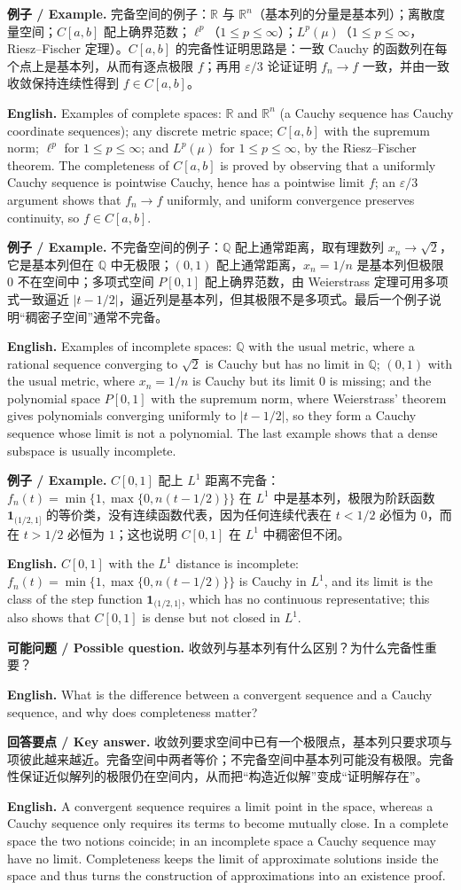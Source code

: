 \documentclass[UTF8,11pt,a4paper]{ctexart}
\newcommand{\EN}[1]{\par\noindent \textbf{English.} #1\par}
\newcommand{\EX}[2]{\par\noindent \textbf{例子 / Example.} #1\par\EN{#2}}
\newcommand{\ASK}[4]{\par\noindent \textbf{可能问题 / Possible question.} #1\par\EN{#2}\noindent \textbf{回答要点 / Key answer.} #3\par\EN{#4}\smallskip}
\begin{document}
\EX{完备空间的例子：$\mathbb R$ 与 $\mathbb R^n$（基本列的分量是基本列）；离散度量空间；$C[a,b]$ 配上确界范数；$\ell^p$（$1\le p\le\infty$）；$L^p(\mu)$（$1\le p\le\infty$，Riesz--Fischer 定理）。$C[a,b]$ 的完备性证明思路是：一致 Cauchy 的函数列在每个点上是基本列，从而有逐点极限 $f$；再用 $\varepsilon/3$ 论证证明 $f_n\to f$ 一致，并由一致收敛保持连续性得到 $f\in C[a,b]$。}{Examples of complete spaces: $\mathbb R$ and $\mathbb R^n$ (a Cauchy sequence has Cauchy coordinate sequences); any discrete metric space; $C[a,b]$ with the supremum norm; $\ell^p$ for $1\le p\le\infty$; and $L^p(\mu)$ for $1\le p\le\infty$, by the Riesz--Fischer theorem. The completeness of $C[a,b]$ is proved by observing that a uniformly Cauchy sequence is pointwise Cauchy, hence has a pointwise limit $f$; an $\varepsilon/3$ argument shows that $f_n\to f$ uniformly, and uniform convergence preserves continuity, so $f\in C[a,b]$.}

\EX{不完备空间的例子：$\mathbb Q$ 配上通常距离，取有理数列 $x_n\to\sqrt2$，它是基本列但在 $\mathbb Q$ 中无极限；$(0,1)$ 配上通常距离，$x_n=1/n$ 是基本列但极限 $0$ 不在空间中；多项式空间 $P[0,1]$ 配上确界范数，由 Weierstrass 定理可用多项式一致逼近 $|t-1/2|$，逼近列是基本列，但其极限不是多项式。最后一个例子说明“稠密子空间”通常不完备。}{Examples of incomplete spaces: $\mathbb Q$ with the usual metric, where a rational sequence converging to $\sqrt2$ is Cauchy but has no limit in $\mathbb Q$; $(0,1)$ with the usual metric, where $x_n=1/n$ is Cauchy but its limit $0$ is missing; and the polynomial space $P[0,1]$ with the supremum norm, where Weierstrass' theorem gives polynomials converging uniformly to $|t-1/2|$, so they form a Cauchy sequence whose limit is not a polynomial. The last example shows that a dense subspace is usually incomplete.}

\EX{$C[0,1]$ 配上 $L^1$ 距离不完备：$f_n(t)=\min\{1,\max\{0,n(t-1/2)\}\}$ 在 $L^1$ 中是基本列，极限为阶跃函数 $\mathbf 1_{(1/2,1]}$ 的等价类，没有连续函数代表，因为任何连续代表在 $t<1/2$ 必恒为 $0$，而在 $t>1/2$ 必恒为 $1$；这也说明 $C[0,1]$ 在 $L^1$ 中稠密但不闭。}{$C[0,1]$ with the $L^1$ distance is incomplete: $f_n(t)=\min\{1,\max\{0,n(t-1/2)\}\}$ is Cauchy in $L^1$, and its limit is the class of the step function $\mathbf 1_{(1/2,1]}$, which has no continuous representative; this also shows that $C[0,1]$ is dense but not closed in $L^1$.}

\ASK{收敛列与基本列有什么区别？为什么完备性重要？}{What is the difference between a convergent sequence and a Cauchy sequence, and why does completeness matter?}{收敛列要求空间中已有一个极限点，基本列只要求项与项彼此越来越近。完备空间中两者等价；不完备空间中基本列可能没有极限。完备性保证近似解列的极限仍在空间内，从而把“构造近似解”变成“证明解存在”。}{A convergent sequence requires a limit point in the space, whereas a Cauchy sequence only requires its terms to become mutually close. In a complete space the two notions coincide; in an incomplete space a Cauchy sequence may have no limit. Completeness keeps the limit of approximate solutions inside the space and thus turns the construction of approximations into an existence proof.}
\end{document}
